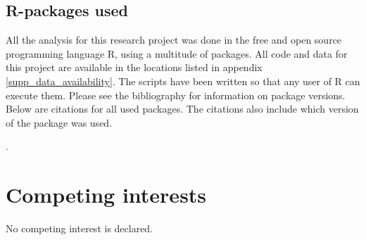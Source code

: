 \documentclass[unnumsec,webpdf,modern,medium]{oup-authoring-template}
\begin{document}
\begin{appendices}
\FloatBarrier

\section{R-packages used}
\label{appendix_r_packages}

All the analysis for this research project was done in the free and open source programming language R, using a multitude of packages. All code and data for this project are available in the locations listed in appendix \ref{supp_data_availability}. The scripts have been written so that any user of R can execute them. Please see the bibliography for information on package versions. Below are citations for all used packages. The citations also include which version of the package was used.

.

\end{appendices}


\newpage
\section{Competing interests}
No competing interest is declared.







\end{document}
